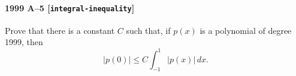 \paragraph{1999 A--5 \textnormal{[\texttt{integral-inequality}]}}
Prove that there is a constant $C$ such that, if $p(x)$ is a polynomial
of degree 1999, then
\[|p(0)|\leq C \int_{-1}^1 |p(x)|\,dx.\]
